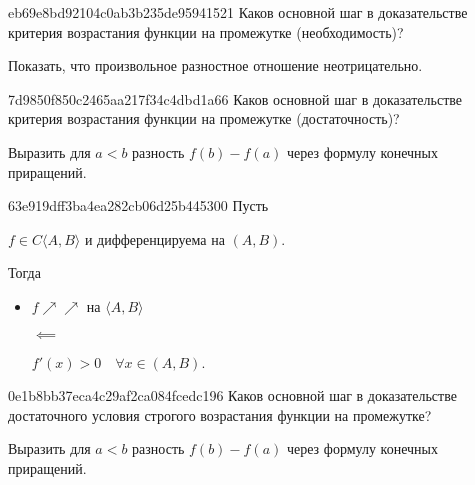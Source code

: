 \begin{note}{eb69e8bd92104c0ab3b235de95941521}
    Каков основной шаг в доказательстве критерия возрастания функции на промежутке (необходимость)?

    \begin{cloze}{1}
        Показать, что произвольное разностное отношение неотрицательно.
    \end{cloze}
\end{note}

\begin{note}{7d9850f850c2465aa217f34c4dbd1a66}
    Каков основной шаг в доказательстве критерия возрастания функции на промежутке (достаточность)?

    \begin{cloze}{1}
        Выразить для \( a < b \) разность \( f(b) - f(a) \) через формулу конечных приращений.
    \end{cloze}
\end{note}

\begin{note}{63e919dff3ba4ea282cb06d25b445300}
    Пусть \begin{icloze}{4}\( f \in C\langle A, B \rangle  \) и дифференцируема на \( (A, B) \).\end{icloze} Тогда
    \begin{itemize}
        \item {}\begin{icloze}{2}\( f \!\nearrow\!\!\nearrow \) на \( \langle A, B \rangle  \)\end{icloze}
            \begin{icloze}{3}\( \impliedby  \)\end{icloze}
            \begin{icloze}{1}\( f'(x) > 0 \quad \forall x \in (A, B) \).\end{icloze}
    \end{itemize}
\end{note}

\begin{note}{0e1b8bb37eca4c29af2ca084fcedc196}
    Каков основной шаг в доказательстве достаточного условия строгого возрастания функции на промежутке?

    \begin{cloze}{1}
        Выразить для \( a < b \) разность \( f(b) - f(a) \) через формулу конечных приращений.
    \end{cloze}
\end{note}

